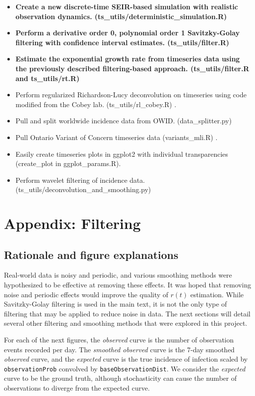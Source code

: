\documentclass{article}
\newcommand{\code}[1]{\texttt{#1}}
\begin{document}
\begin{itemize}
	\item \textbf{Create a new discrete-time SEIR-based simulation with realistic observation dynamics. (ts\_utils/deterministic\_simulation.R)}
	\item \textbf{Perform a derivative order 0, polynomial order 1 Savitzky-Golay filtering with confidence interval estimates. (ts\_utils/filter.R)}
	\item \textbf{Estimate the exponential growth rate from timeseries data using the previously described filtering-based approach. (ts\_utils/filter.R and ts\_utils/rt.R)}
	\item Perform regularized Richardson-Lucy deconvolution on timeseries using code modified from the Cobey lab. (ts\_utils/rl\_cobey.R) \cite{Gostic}.
	\item Pull and split worldwide incidence data from OWID. (data\_splitter.py) \cite{OWID}
	\item Pull Ontario Variant of Concern timeseries data (variants\_mli.R) \cite{mli}.
	\item Easily create timeseries plots in ggplot2 with individual transparencies (create\_plot in ggplot\_params.R).
	\item Perform wavelet filtering of incidence data. (ts\_utils/deconvolution\_and\_smoothing.py)
\end{itemize}

\section{Appendix: Filtering}
\subsection{Rationale and figure explanations}
Real-world data is noisy and periodic, and various smoothing methods were hypothesized to be effective at removing these effects. It was hoped that removing noise and periodic effects would improve the quality of $r(t)$ estimation. While Savitzky-Golay filtering is used in the main text, it is not the only type of filtering that may be applied to reduce noise in data. The next sections will detail several other filtering and smoothing methods that were explored in this project.

For each of the next figures, the \emph{observed} curve is the number of observation events recorded per day. The \emph {smoothed observed} curve is the 7-day smoothed \emph{observed} curve, and the \emph{expected} curve is the true incidence of infection scaled by \code{observationProb} convolved by \code{baseObservationDist}. We consider the \emph{expected} curve to be the ground truth, although stochasticity can cause the number of observations to diverge from the expected curve.
\end{document}
